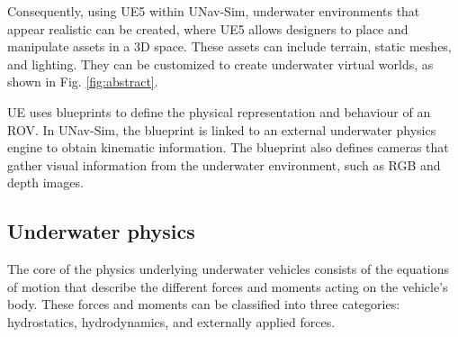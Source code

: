 Consequently, using \ac{UE5} within UNav-Sim, underwater environments that appear realistic can be created, where \ac{UE5} allows designers to place and manipulate assets in a 3D space. 
These assets can include terrain, static meshes, and lighting. They can be customized to create underwater virtual worlds, as shown in Fig. \ref{fig:abstract}. 

UE uses blueprints to define the physical representation and behaviour of an \ac{ROV}. In UNav-Sim, the blueprint is linked to an external underwater physics engine to obtain kinematic information. The blueprint also defines cameras that gather visual information from the underwater environment, such as RGB and depth images. 



\subsection{Underwater physics}

The core of the physics underlying underwater vehicles consists of the equations of motion that describe the different forces and moments acting on the vehicle's body. These forces and moments can be classified into three categories: hydrostatics, hydrodynamics, and externally applied forces.




